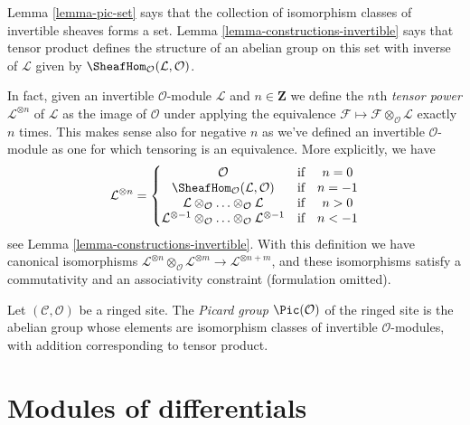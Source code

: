 \noindent
Lemma \ref{lemma-pic-set} says that the collection of
isomorphism classes of invertible sheaves forms a set.
Lemma \ref{lemma-constructions-invertible} says that
tensor product defines the structure of an abelian group
on this set with inverse of $\mathcal{L}$ given by
$\SheafHom_\mathcal{O}(\mathcal{L}, \mathcal{O})$.

\medskip\noindent
In fact, given an invertible $\mathcal{O}$-module
$\mathcal{L}$ and $n \in \mathbf{Z}$ we define the
$n$th {\it tensor power} $\mathcal{L}^{\otimes n}$ of $\mathcal{L}$
as the image of $\mathcal{O}$ under applying the equivalence
$\mathcal{F} \mapsto \mathcal{F} \otimes_\mathcal{O} \mathcal{L}$
exactly $n$ times. This makes sense also for negative $n$ as
we've defined an invertible
$\mathcal{O}$-module as one for which tensoring is an equivalence.
More explicitly, we have
$$
\mathcal{L}^{\otimes n} =
\left\{
\begin{matrix}
\mathcal{O} & \text{if} & n = 0 \\
\SheafHom_\mathcal{O}(\mathcal{L}, \mathcal{O}) & \text{if} & n = -1\\
\mathcal{L} \otimes_\mathcal{O} \ldots \otimes_\mathcal{O} \mathcal{L}
& \text{if} & n > 0 \\
\mathcal{L}^{\otimes -1} \otimes_\mathcal{O} \ldots
\otimes_\mathcal{O} \mathcal{L}^{\otimes -1}
& \text{if} & n < -1
\end{matrix}
\right.
$$
see Lemma \ref{lemma-constructions-invertible}.
With this definition we have canonical isomorphisms
$\mathcal{L}^{\otimes n} \otimes_\mathcal{O}
\mathcal{L}^{\otimes m} \to
\mathcal{L}^{\otimes n + m}$, and these isomorphisms
satisfy a commutativity and an associativity constraint
(formulation omitted).

\begin{definition}
\label{definition-pic}
Let $(\mathcal{C}, \mathcal{O})$ be a ringed site.
The {\it Picard group} $\Pic(\mathcal{O})$ of
the ringed site is the
abelian group whose elements are isomorphism classes of
invertible $\mathcal{O}$-modules, with addition
corresponding to tensor product.
\end{definition}









\section{Modules of differentials}
\label{section-differentials}

